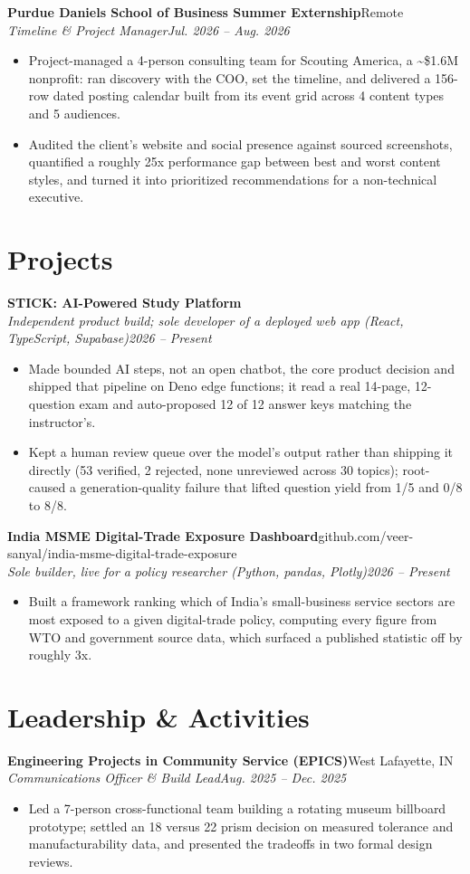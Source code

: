 \documentclass[10pt,letterpaper]{article}
\newcommand{\entry}[4]{%
  \textbf{#1}\hfill #2\\[1pt]
  \textit{#3}\hfill \textit{#4}\\[2pt]
}
\begin{document}
\entry{Purdue Daniels School of Business Summer Externship}{Remote}{Timeline \& Project Manager}{Jul. 2026 -- Aug. 2026}
\begin{itemize}
  \item Project-managed a 4-person consulting team for Scouting America, a \textasciitilde\$1.6M nonprofit: ran discovery with the COO, set the timeline, and delivered a 156-row dated posting calendar built from its event grid across 4 content types and 5 audiences.
  \item Audited the client's website and social presence against sourced screenshots, quantified a roughly 25x performance gap between best and worst content styles, and turned it into prioritized recommendations for a non-technical executive.
\end{itemize}

\section*{Projects}
\entry{STICK: AI-Powered Study Platform}{}{Independent product build; sole developer of a deployed web app (React, TypeScript, Supabase)}{2026 -- Present}
\begin{itemize}
  \item Made bounded AI steps, not an open chatbot, the core product decision and shipped that pipeline on Deno edge functions; it read a real 14-page, 12-question exam and auto-proposed 12 of 12 answer keys matching the instructor's.
  \item Kept a human review queue over the model's output rather than shipping it directly (53 verified, 2 rejected, none unreviewed across 30 topics); root-caused a generation-quality failure that lifted question yield from 1/5 and 0/8 to 8/8.
\end{itemize}

\entry{India MSME Digital-Trade Exposure Dashboard}{github.com/veer-sanyal/india-msme-digital-trade-exposure}{Sole builder, live for a policy researcher (Python, pandas, Plotly)}{2026 -- Present}
\begin{itemize}
  \item Built a framework ranking which of India's small-business service sectors are most exposed to a given digital-trade policy, computing every figure from WTO and government source data, which surfaced a published statistic off by roughly 3x.
\end{itemize}

\section*{Leadership \& Activities}
\entry{Engineering Projects in Community Service (EPICS)}{West Lafayette, IN}{Communications Officer \& Build Lead}{Aug. 2025 -- Dec. 2025}
\begin{itemize}
  \item Led a 7-person cross-functional team building a rotating museum billboard prototype; settled an 18 versus 22 prism decision on measured tolerance and manufacturability data, and presented the tradeoffs in two formal design reviews.
\end{itemize}
\end{document}
